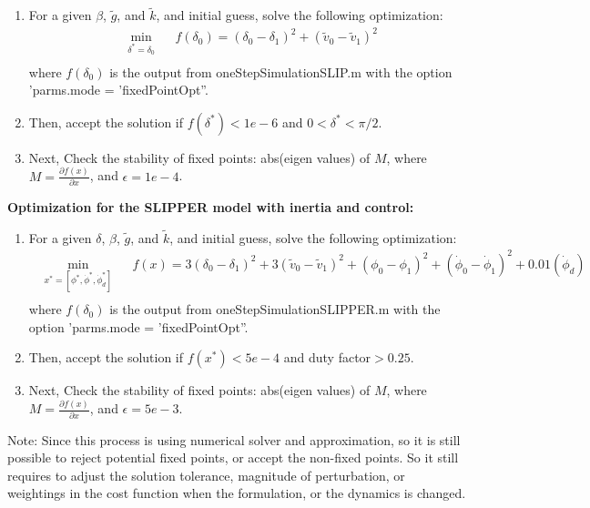 \begin{enumerate}
	\item For a given $\beta$, $\tilde g$, and $\tilde k$, and initial guess, solve the following optimization:
	\begin{equation*}
	\begin{aligned}
	& \underset{\delta^*=\delta_0}{\text{min}}
	& & f(\delta_0)=(\delta_0 -\delta_1)^2 + (\tilde v_0 -\tilde v_1)^2 \\
	\end{aligned}
	\end{equation*}
	where $f(\delta_0)$ is the output from oneStepSimulationSLIP.m with the option 'parms.mode = 'fixedPointOpt''.	
	\item Then, accept the solution if
	$f(\delta^*)<1e-6$ and $0<\delta^*<\pi/2$.
	\item  Next, Check the stability of fixed points:
	abs(eigen values) of $M$, 
	where $M = \frac{\partial f(x)}{\partial x}$, and $\epsilon = 1e-4$.	
\end{enumerate}
 


\noindent \textbf{Optimization for the SLIPPER model with inertia and control:}\\

\begin{enumerate}
	\item For a given $\delta$, $\beta$, $\tilde g$, and $\tilde k$, and initial guess, solve the following optimization:
	\begin{equation*}
	\begin{aligned}
	& \underset{x^*=[\phi^*,\dot\phi^*,\dot\phi_d^*]}{\text{min}}
	& & f(x)=3(\delta_0 -\delta_1)^2 + 3(\tilde v_0 -\tilde v_1)^2+(\phi_0 -\phi_1)^2+(\dot\phi_0 -\dot\phi_1)^2+0.01(\dot\phi_d) \\
	\end{aligned}
	\end{equation*}
	where $f(\delta_0)$ is the output from oneStepSimulationSLIPPER.m with the option 'parms.mode = 'fixedPointOpt''.
	\item  Then, accept the solution if $f(x^*)<5e-4$ and duty factor$>0.25$.
	\item  Next, Check the stability of fixed points:
abs(eigen values) of $M$, 
where $M = \frac{\partial f(x)}{\partial x}$, and $\epsilon = 5e-3$.		
\end{enumerate}

Note: Since this process is using numerical solver and approximation, so it is still possible to reject potential fixed points, or accept the non-fixed points. So it still requires to adjust the solution tolerance, magnitude of perturbation, or weightings in the cost function when the formulation, or the dynamics is changed.

\pagebreak